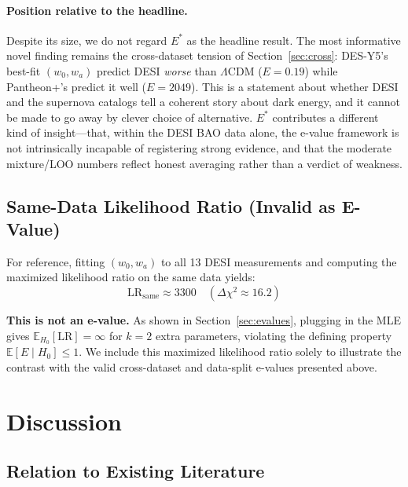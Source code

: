 \documentclass[11pt,a4paper]{article}
\newcommand{\E}{\mathbb{E}}
\newcommand{\LCDM}{$\Lambda$CDM}
\begin{document}
\paragraph{Position relative to the headline.} Despite its size, we do not regard $E^{*}$ as the headline result. The most informative novel finding remains the cross-dataset tension of Section~\ref{sec:cross}: DES-Y5's best-fit $(w_0, w_a)$ predict DESI \emph{worse} than \LCDM{} ($E = 0.19$) while Pantheon+'s predict it well ($E = 2049$). This is a statement about whether DESI and the supernova catalogs tell a coherent story about dark energy, and it cannot be made to go away by clever choice of alternative. $E^{*}$ contributes a different kind of insight---that, within the DESI BAO data alone, the e-value framework is not intrinsically incapable of registering strong evidence, and that the moderate mixture/LOO numbers reflect honest averaging rather than a verdict of weakness.

\subsection{Same-Data Likelihood Ratio (Invalid as E-Value)}
\label{sec:samedata}

For reference, fitting $(w_0, w_a)$ to all 13 DESI measurements and computing the maximized likelihood ratio on the same data yields:
\begin{equation}
\text{LR}_{\text{same}} \approx 3300 \quad (\Delta\chi^2 \approx 16.2)
\end{equation}

\textbf{This is not an e-value.} As shown in Section~\ref{sec:evalues}, plugging in the MLE gives $\E_{H_0}[\text{LR}] = \infty$ for $k=2$ extra parameters, violating the defining property $\E[E \mid H_0] \leq 1$. We include this maximized likelihood ratio solely to illustrate the contrast with the valid cross-dataset and data-split e-values presented above.

\section{Discussion}
\label{sec:discussion}

\subsection{Relation to Existing Literature}
\end{document}
